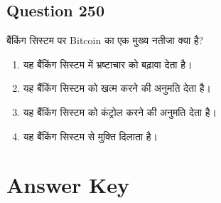 \documentclass[12pt,a4paper]{article}
\begin{document}
\bigskip


\subsection*{Question 250}
बैंकिंग सिस्टम पर Bitcoin का एक मुख्य नतीजा क्या है?

\begin{enumerate}[label=\Alph*., leftmargin=*]
\item यह बैंकिंग सिस्टम में भ्रष्टाचार को बढ़ावा देता है।
\item यह बैंकिंग सिस्टम को खत्म करने की अनुमति देता है।
\item यह बैंकिंग सिस्टम को कंट्रोल करने की अनुमति देता है।
\item यह बैंकिंग सिस्टम से मुक्ति दिलाता है।
\end{enumerate}

\bigskip


\newpage
\section*{Answer Key}
\end{document}
